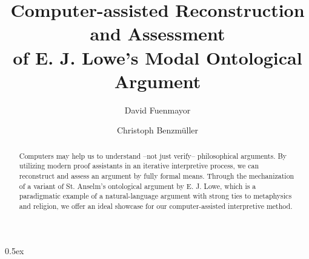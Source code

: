 \documentclass[11pt,a4paper]{article}
\begin{document}
\title{Computer-assisted Reconstruction and Assessment\\
	of E. J. Lowe's Modal Ontological Argument}
\author[1]{David Fuenmayor}
\author[2,1]{Christoph Benzm\"uller}

\maketitle

\begin{abstract}
	Computers may help us to understand --not just verify-- philosophical arguments.
	By utilizing modern proof assistants in an iterative interpretive process, we can
	reconstruct and assess an argument by fully formal means.
	Through the mechanization of a variant of St. Anselm's ontological argument by E. J. Lowe,
	which is a paradigmatic example of a natural-language argument with strong ties to metaphysics and religion,
	we offer an ideal showcase for our computer-assisted interpretive method.
\end{abstract}

\tableofcontents

\parindent 0pt\parskip 0.5ex





\end{document}
